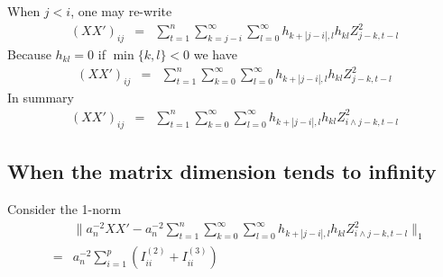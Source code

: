 \documentclass{article}
\begin{document}
When $j < i$, one may re-write
\begin{eqnarray*}
  (XX')_{ij} &=& \sum_{t=1}^n \sum_{k=j-i}^\infty \sum_{l=0}^\infty
  h_{k+|j-i|,l} h_{kl} Z_{j-k, t-l}^2
\end{eqnarray*}
Because $h_{kl} = 0$ if $\min\{k,l\} < 0$ we have
\begin{eqnarray*}
  (XX')_{ij} &=& \sum_{t=1}^n \sum_{k=0}^\infty \sum_{l=0}^\infty
  h_{k+|j-i|,l} h_{kl} Z_{j-k, t-l}^2
\end{eqnarray*}
In summary
\begin{eqnarray*}
  (XX')_{ij} &=& \sum_{t=1}^n \sum_{k=0}^\infty \sum_{l=0}^\infty
  h_{k+|j-i|,l} h_{kl} Z_{i \wedge j -k, t-l}^2
\end{eqnarray*}

\subsection{When the matrix dimension tends to infinity}
Consider the 1-norm
\begin{eqnarray*}
  && \| a_n^{-2} XX' - a_n^{-2} \sum_{t=1}^n
     \sum_{k=0}^\infty \sum_{l=0}^\infty
     h_{k+|j-i|,l} h_{kl} Z_{i \wedge j -k, t-l}^2\|_1 \\
  &=& a_n^{-2} \sum_{i=1}^p (I^{(2)}_{ii} + I^{(3)}_{ii})
\end{eqnarray*}



\end{document}
